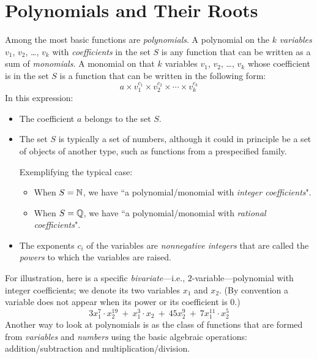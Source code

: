 \section{Polynomials and Their Roots}
\label{sec:polynomials}

 
    
 
  

Among the most basic functions are {\it polynomials}.  A polynomial on the $k$ {\it variables} $v_1$, $v_2$, \ldots, $v_k$ with {\it coefficients} in the set $S$ is any function that can be written as a sum of {\it monomials}.  A monomial on that $k$ variables $v_1$, $v_2$, \ldots, $v_k$ whose coefficient is in the set $S$ is a function that can be written in the following form:
\begin{equation}
\label{eq:monomial}
a \times v_1^{c_1} \times v_2^{c_2} \times \cdots \times v_k^{c_k}
\end{equation}
In this expression: 
\begin{itemize}
\item
The coefficient $a$ belongs to the set $S$.
\medskip\item
The set $S$ is typically a set of numbers, although it could in principle be a set of objects of another type, such as functions from a prespecified family.

\smallskip

Exemplifying the typical case:
  \begin{itemize}
  \item
When $S = \mathbb{N}$, we have ``a polynomial/monomial with {\em integer coefficients}".
  \medskip\item
When $S = \mathbb{Q}$, we have ``a polynomial/monomial with {\em rational coefficients}".
  \end{itemize}
\medskip\item
The exponents $c_i$ of the variables are {\em nonnegative integers} that are called the {\it powers} to which the variables are raised.
\end{itemize}
For illustration, here is a specific {\em bivariate}---i.e., $2$-variable---polynomial with integer coefficients; we denote its two variables $x_1$ and $x_2$.  (By convention a variable does not appear when its power or its coefficient is $0$.)
\[ 
3 x_1^7 \cdot x_2^{19} \ + \ x_1^3 \cdot x_2 \ + \ 45 x_2^{9} \ + \ 7 x_1^{11} \cdot x_2^{5}
\]
Another way to look at polynomials is as the class of functions that are formed from {\it variables} and {\it numbers} using the basic algebraic operations: addition/subtraction and
multiplication/division.

